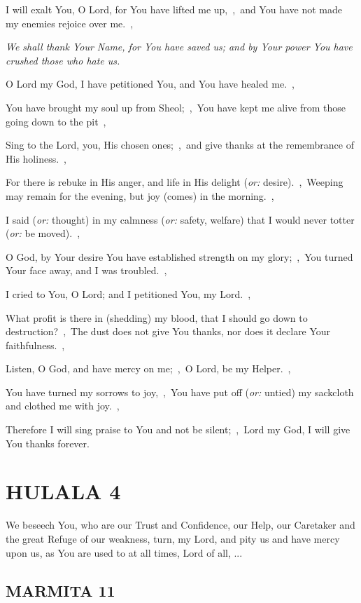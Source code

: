 \documentclass[12pt,twoside,a5paper]{article}
\newcommand{\hulala}[1]{\section*{HULALA {#1}}}
\newcommand{\marmita}[1]{\subsection*{MARMITA {#1}}}
\newcommand{\qanona}[1]{{\liturgicalhint{Qanona.} \emph{#1}}}
\newcommand{\slota}[1]{\liturgicalhint{Slota.} #1}
\newcommand{\translationoption}[1]{\emph{or:} #1}
\begin{document}
\begin{normalparskip}
  I will exalt You, O Lord, for You have lifted me up,~\sep\ and You have not made my enemies rejoice over me.~\sep

  \qanona{We shall thank Your Name, for You have saved us; and by Your power You have crushed those who hate us.}

  O Lord my God, I have petitioned You, and You have healed me.~\sep

  You have brought my soul up from Sheol;~\sep\ You have kept me alive from those going down to the pit~\sep

  Sing to the Lord, you, His chosen ones;~\sep\ and give thanks at the remembrance of His holiness.~\sep

  For there is rebuke in His anger, and life in His delight (\translationoption{desire}).~\sep\ Weeping may remain for the evening, but joy (comes) in the morning.~\sep

  I said (\translationoption{thought}) in my calmness (\translationoption{safety, welfare}) that I would never totter (\translationoption{be moved}).~\sep

  O God, by Your desire You have established strength on my glory;~\sep\ You turned Your face away, and I was troubled.~\sep

  I cried to You, O Lord; and I petitioned You, my Lord.~\sep

  What profit is there in (shedding) my blood, that I should go down to destruction?~\sep\ The dust does not give You thanks, nor does it declare Your faithfulness.~\sep

  Listen, O God, and have mercy on me;~\sep\ O Lord, be my Helper.~\sep

  You have turned my sorrows to joy,~\sep\ You have put off (\translationoption{untied}) my sackcloth and clothed me with joy.~\sep

  Therefore I will sing praise to You and not be silent;~\sep\ Lord my God, I will give You thanks forever.
\end{normalparskip}


\hulala{4}

\slota{We beseech You, who are our Trust and Confidence, our Help, our Caretaker and the great Refuge of our weakness, turn, my Lord, and pity us and have mercy upon us, as You are used to at all times, Lord of all, ...}

\marmita{11}
\end{document}
